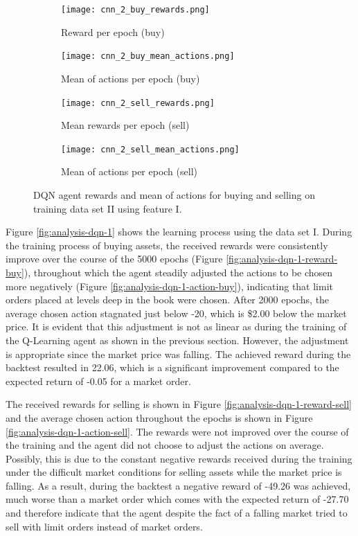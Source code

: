 \begin{figure}[H]
    \centering
    \begin{subfigure}[b]{0.4\textwidth}
        \texttt{[image: cnn\_2\_buy\_rewards.png]}
        \caption{Reward per epoch (buy)}
        \label{fig:analysis-dqn-2-reward-buy}
    \end{subfigure}
    \begin{subfigure}[b]{0.4\textwidth}
        \texttt{[image: cnn\_2\_buy\_mean\_actions.png]}
        \caption{Mean of actions per epoch (buy)}
        \label{fig:analysis-dqn-2-action-buy}
    \end{subfigure}
    \begin{subfigure}[b]{0.4\textwidth}
        \texttt{[image: cnn\_2\_sell\_rewards.png]}
        \caption{Mean rewards per epoch (sell)}
        \label{fig:analysis-dqn-2-reward-sell}
    \end{subfigure}
    \begin{subfigure}[b]{0.4\textwidth}
        \texttt{[image: cnn\_2\_sell\_mean\_actions.png]}
        \caption{Mean of actions per epoch (sell)}
        \label{fig:analysis-dqn-2-action-sell}
    \end{subfigure}
    \caption{DQN agent rewards and mean of actions for buying and selling on training data set II using feature I.}
    \label{fig:analysis-dqn-2}
\end{figure}

Figure \ref{fig:analysis-dqn-1} shows the learning process using the data set I.
During the training process of buying assets, the received rewards were consistently improve over the course of the 5000 epochs (Figure \ref{fig:analysis-dqn-1-reward-buy}), throughout which the agent steadily adjusted the actions to be chosen more negatively (Figure \ref{fig:analysis-dqn-1-action-buy}), indicating that limit orders placed at levels deep in the book were chosen.
After 2000 epochs, the average chosen action stagnated just below -20, which is \$2.00 below the market price.
It is evident that this adjustment is not as linear as during the training of the Q-Learning agent as shown in the previous section.
However, the adjustment is appropriate since the market price was falling.
The achieved reward during the backtest resulted in 22.06, which is a significant improvement compared to the expected return of -0.05 for a market order.

The received rewards for selling is shown in Figure \ref{fig:analysis-dqn-1-reward-sell} and the average chosen action throughout the epochs is shown in Figure \ref{fig:analysis-dqn-1-action-sell}.
The rewards were not improved over the course of the training and the agent did not choose to adjust the actions on average.
Possibly, this is due to the constant negative rewards received during the training under the difficult market conditions for selling assets while the market price is falling.
As a result, during the backtest a negative reward of -49.26 was achieved, much worse than a market order which comes with the expected return of -27.70 and therefore indicate that the agent despite the fact of a falling market tried to sell with limit orders instead of market orders.

